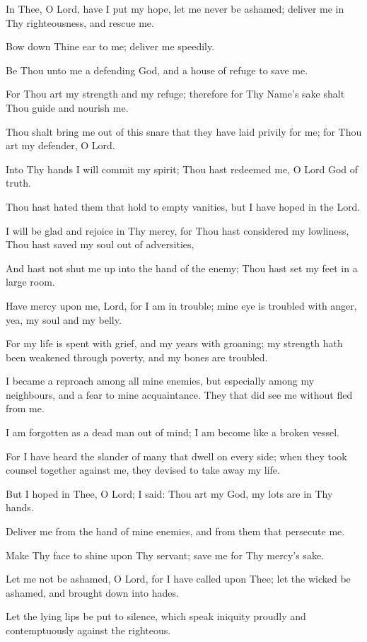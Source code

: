 In Thee, O Lord, have I put my hope, let me never be ashamed; deliver me in Thy righteousness, and rescue me.

Bow down Thine ear to me; deliver me speedily.

Be Thou unto me a defending God, and a house of refuge to save me.

For Thou art my strength and my refuge; therefore for Thy Name's sake shalt Thou guide and nourish me.

Thou shalt bring me out of this snare that they have laid privily for me; for Thou art my defender, O Lord.

Into Thy hands I will commit my spirit; Thou hast redeemed me, O Lord God of truth.

Thou hast hated them that hold to empty vanities, but I have hoped in the Lord.

I will be glad and rejoice in Thy mercy, for Thou hast considered my lowliness, Thou hast saved my soul out of adversities,

And hast not shut me up into the hand of the enemy; Thou hast set my feet in a large room.

Have mercy upon me, Lord, for I am in trouble; mine eye is troubled with anger, yea, my soul and my belly.

For my life is spent with grief, and my years with groaning; my strength hath been weakened through poverty, and my bones are
troubled.

I became a reproach among all mine enemies, but especially among my neighbours, and a fear to mine acquaintance. They that did see me without fled from me.

I am forgotten as a dead man out of mind; I am become like a broken vessel.

For I have heard the slander of many that dwell on every side; when they took counsel together against me, they devised to take away my life.

But I hoped in Thee, O Lord; I said: Thou art my God, my lots are in Thy hands.

Deliver me from the hand of mine enemies, and from them that persecute me.

Make Thy face to shine upon Thy servant; save me for Thy mercy’s sake.

Let me not be ashamed, O Lord, for I have called upon Thee; let the wicked be ashamed, and brought down into hades.

Let the lying lips be put to silence, which speak iniquity proudly and contemptuously against the righteous.

